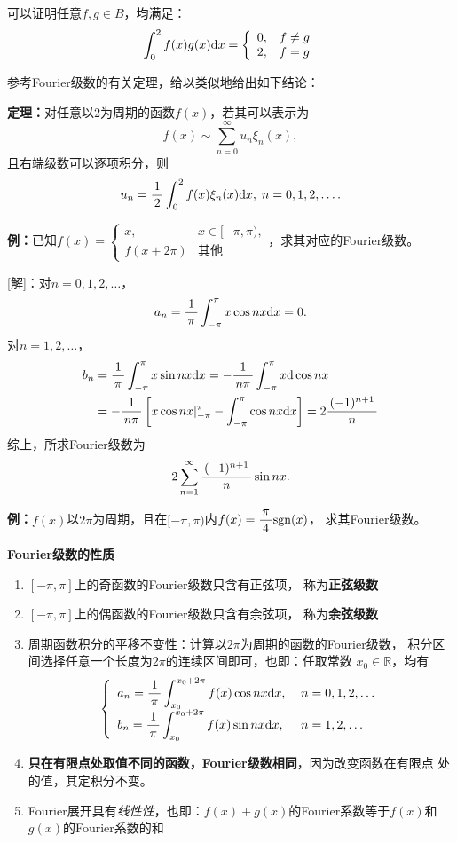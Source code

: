 \begin{shaded}
	可以证明任意$f,g\in B$，均满足：
	$$\displaystyle\int_0^{2}f(x)g(x)\mathrm{d} x=
	\left\{\begin{array}{ll}
		0,& f\ne g\\ 2,& f=g
	\end{array}\right.$$
	
	参考Fourier级数的有关定理，给以类似地给出如下结论：
	
	\begin{tcolorbox}
		{\bf 定理：}对任意以$2$为周期的函数$f(x)$，若其可以表示为
		$$f(x)\sim\sum\limits_{n=0}^{\infty}u_n\xi_n(x),$$
		且右端级数可以逐项积分，则
		$$
		u_n=\displaystyle\frac{\,{1}\,}{\,{2}\,}\displaystyle\int_0^2f(x)\xi_n(x)\mathrm{d} x,\;n=0,1,2,\ldots.
		$$
	\end{tcolorbox}
\end{shaded}

{\bf 例：}已知$f(x)=\left\{\begin{array}{ll}
	x,& x\in[-\pi,\pi),\\ f(x+2\pi)& \mbox{其他}
\end{array}\right.$，求其对应的Fourier级数。

[解]：对$n=0,1,2,\ldots$，
$$a_n=\displaystyle\frac{\,{1}\,}{\,{\pi}\,}\displaystyle\int_{-\pi}^{\pi}x\cos nx\mathrm{d} x=0.$$
对$n=1,2,\ldots$，
\begin{align*}
	b_n&=\displaystyle\frac{\,{1}\,}{\,{\pi}\,}\displaystyle\int_{-\pi}^{\pi}x\sin nx\mathrm{d} x
	=-\displaystyle\frac{\,{1}\,}{\,{n\pi}\,}\displaystyle\int_{-\pi}^{\pi}x\mathrm{d}\cos nx\\
	&=-\displaystyle\frac{\,{1}\,}{\,{n\pi}\,}\left[x\cos nx|_{-\pi}^{\pi}
	-\displaystyle\int_{-\pi}^{\pi}\cos nx\mathrm{d} x\right]=2\displaystyle\frac{\,{(-1)^{n+1}}\,}{\,{n}\,}
\end{align*}
综上，所求Fourier级数为
$$2\sum\limits_{n=1}^{\infty}\displaystyle\frac{\,{(-1)^{n+1}}\,}{\,{n}\,}\sin nx.$$
\fin

{\bf 例：}$f(x)$以$2\pi$为周期，且在$[-\pi,\pi)$内$f(x)=\displaystyle\frac{\,{\pi}\,}{\,{4}\,}\mathrm{sgn}(x)$，
求其Fourier级数。

\begin{thx}
	{\bf Fourier级数的性质}
	\begin{enumerate}%
	  \item $[-\pi,\pi]$上的奇函数的Fourier级数只含有正弦项， 称为{\bf 正弦级数}
	  \item $[-\pi,\pi]$上的偶函数的Fourier级数只含有余弦项， 称为{\bf 余弦级数}
	  \item {\kaishu 周期函数积分的平移不变性：}计算以$2\pi$为周期的函数的Fourier级数，
	  积分区间选择任意一个长度为$2\pi$的连续区间即可，也即：任取常数
	  $x_0\in\mathbb{R}$，均有
	  	$$\left\{\begin{array}{ll}
			a_n=\displaystyle\frac{\,{1}\,}{\,{\pi}\,}\displaystyle\int_{x_0}^{x_0+2\pi}f(x)\cos nx\mathrm{d} x,\;& n=0,1,2,\ldots\\[5pt]
			b_n=\displaystyle\frac{\,{1}\,}{\,{\pi}\,}\displaystyle\int_{x_0}^{x_0+2\pi}f(x)\sin nx\mathrm{d} x,\;& n=1,2,\ldots
	  	\end{array}\right.$$
	  \item {\bf 只在有限点处取值不同的函数，Fourier级数相同}，因为改变函数在有限点
	  处的值，其定积分不变。
	  \item Fourier展开具有{\it 线性性}，也即：$f(x)+g(x)$的Fourier系数等于$f(x)$和
	  $g(x)$的Fourier系数的和
	\end{enumerate}
\end{thx}

